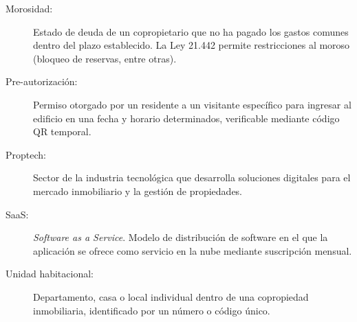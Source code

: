 \begin{description}
    \item[Morosidad:] Estado de deuda de un copropietario que no ha pagado los gastos comunes dentro del plazo establecido. La Ley 21.442 permite restricciones al moroso (bloqueo de reservas, entre otras).

    \item[Pre-autorización:] Permiso otorgado por un residente a un visitante específico para ingresar al edificio en una fecha y horario determinados, verificable mediante código QR temporal.

    \item[Proptech:] Sector de la industria tecnológica que desarrolla soluciones digitales para el mercado inmobiliario y la gestión de propiedades.

    \item[SaaS:] \textit{Software as a Service}. Modelo de distribución de software en el que la aplicación se ofrece como servicio en la nube mediante suscripción mensual.

    \item[Unidad habitacional:] Departamento, casa o local individual dentro de una copropiedad inmobiliaria, identificado por un número o código único.
\end{description}
